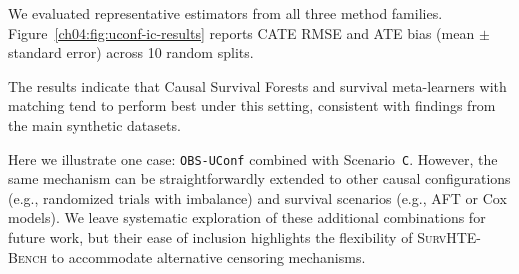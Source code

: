 We evaluated representative estimators from all three method families. 
Figure~\ref{ch04:fig:uconf-ic-results} reports CATE RMSE and ATE bias (mean $\pm$ standard error) across 10 random splits. 







The results indicate that Causal Survival Forests and survival meta-learners with matching tend to perform best under this setting, consistent with findings from the main synthetic datasets. 

Here we illustrate one case: \texttt{OBS-UConf} combined with Scenario~\texttt{C}.  
However, the same mechanism can be straightforwardly extended to other causal configurations (e.g., randomized trials with imbalance) and survival scenarios (e.g., AFT or Cox models).  
We leave systematic exploration of these additional combinations for future work, but their ease of inclusion highlights the flexibility of \textsc{SurvHTE-Bench} to accommodate alternative censoring mechanisms.%




